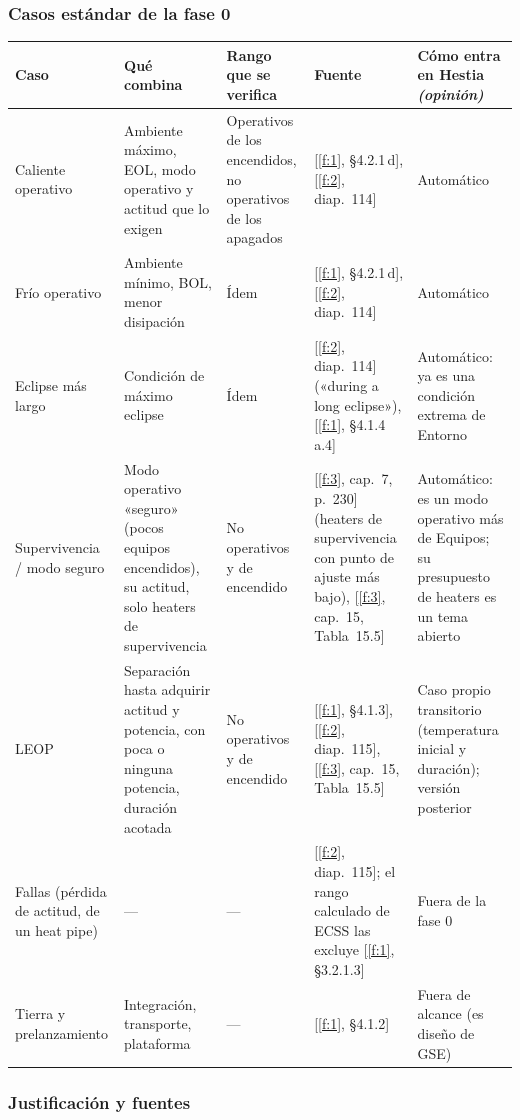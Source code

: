 \documentclass[11pt,a4paper]{article}
\newcommand{\op}[1]{\textcolor{opinion}{\textit{(#1)}}}
\newcommand{\f}[1]{\ref{f:#1}}
\begin{document}
\subsubsection*{Casos estándar de la fase 0}

{\small
\begin{xltabular}{\textwidth}{@{}P{2.3cm}LP{2.6cm}P{2.9cm}L@{}}
\toprule
\textbf{Caso} & \textbf{Qué combina} & \textbf{Rango que se verifica} & \textbf{Fuente} & \textbf{Cómo entra en Hestia} \op{opinión} \\
\midrule
\endhead
Caliente operativo & Ambiente máximo, EOL, modo operativo y actitud que lo exigen & Operativos de los encendidos, no operativos de los apagados & [\f{1}, §4.2.1\,d], [\f{2}, diap.~114] & Automático \\
Frío operativo & Ambiente mínimo, BOL, menor disipación & Ídem & [\f{1}, §4.2.1\,d], [\f{2}, diap.~114] & Automático \\
Eclipse más largo & Condición de máximo eclipse & Ídem & [\f{2}, diap.~114] («during a long eclipse»), [\f{1}, §4.1.4\,a.4] & Automático: ya es una condición extrema de Entorno \\
Supervivencia / modo seguro & Modo operativo «seguro» (pocos equipos encendidos), su actitud, solo heaters de supervivencia & No operativos y de encendido & [\f{3}, cap.~7, p.~230] (heaters de supervivencia con punto de ajuste más bajo), [\f{3}, cap.~15, Tabla~15.5] & Automático: es un modo operativo más de Equipos; su presupuesto de heaters es un tema abierto \\
LEOP & Separación hasta adquirir actitud y potencia, con poca o ninguna potencia, duración acotada & No operativos y de encendido & [\f{1}, §4.1.3], [\f{2}, diap.~115], [\f{3}, cap.~15, Tabla~15.5] & Caso propio transitorio (temperatura inicial y duración); versión posterior \\
Fallas (pérdida de actitud, de un heat pipe) & --- & --- & [\f{2}, diap.~115]; el rango calculado de ECSS las excluye [\f{1}, §3.2.1.3] & Fuera de la fase 0 \\
Tierra y prelanzamiento & Integración, transporte, plataforma & --- & [\f{1}, §4.1.2] & Fuera de alcance (es diseño de GSE) \\
\bottomrule
\end{xltabular}
}

\subsubsection*{Justificación y fuentes}
\end{document}
